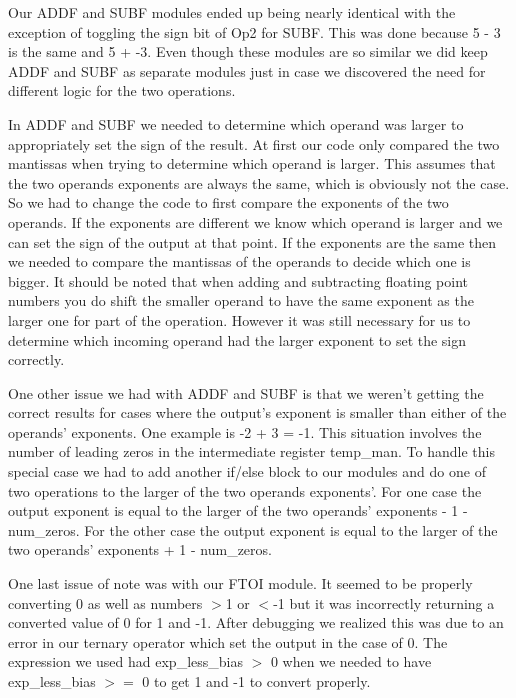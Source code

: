 \documentclass{article}
\begin{document}
\begin{multicols}{2}
Our ADDF and SUBF modules ended up being nearly identical with the exception of toggling the sign bit of Op2 for SUBF. This was done because 5 - 3 is the same and 5 + -3. Even though these modules are so similar we did keep ADDF and SUBF as separate modules just in case we discovered the need for different logic for the two operations.

In ADDF and SUBF we needed to determine which operand was larger to appropriately set the sign of the result. At first our code only compared the two mantissas when trying to determine which operand is larger. This assumes that the two operands exponents are always the same, which is obviously not the case. So we had to change the code to first compare the exponents of the two operands. If the exponents are different we know which operand is larger and we can set the sign of the output at that point. If the exponents are the same then we needed to compare the mantissas of the operands to decide which one is bigger. It should be noted that when adding and subtracting floating point numbers you do shift the smaller operand to have the same exponent as the larger one for part of the operation. However it was still necessary for us to determine which incoming operand had the larger exponent to set the sign correctly.

One other issue we had with ADDF and SUBF is that we weren't getting the correct results for cases where the output's exponent is smaller than either of the operands' exponents. One example is -2 + 3 = -1. This situation involves the number of leading zeros in the intermediate register temp\_man. To handle this special case we had to add another if/else block to our modules and do one of two operations to the larger of the two operands exponents'. For one case the output exponent is equal to the larger of the two operands' exponents - 1 - num\_zeros. For the other case the output exponent is equal to the larger of the two operands' exponents + 1 - num\_zeros.

One last issue of note was with our FTOI module. It seemed to be properly converting 0 as well as numbers $>$1 or $<$-1 but it was incorrectly returning a converted value of 0 for 1 and -1. After debugging we realized this was due to an error in our ternary operator which set the output in the case of 0. The expression we used had exp\_less\_bias $>$ 0 when we needed to have exp\_less\_bias $>=$ 0 to get 1 and -1 to convert properly.
  

\end{multicols}
\end{document}
